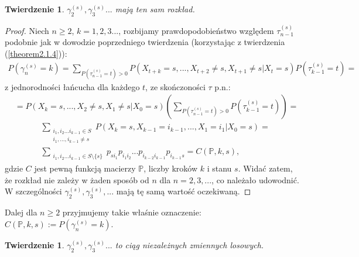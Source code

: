 \documentclass[a4paper]{article}
\theoremstyle{defn}
\theoremstyle{theorem}
\newtheorem{theorem}[defn]{Twierdzenie}
\theoremstyle{lemma}
\theoremstyle{cor}
\theoremstyle{fact}
\begin{document}
\begin{theorem}\label{theorem2.5.8}
$\gamma_2^{(s)}, \gamma_3^{(s)}...$ mają ten sam rozkład.
\end{theorem}
\begin{proof}
Niech $n\geq 2$, $k = 1,2,3...$, rozbijamy prawdopodobieństwo względem $\tau_{n-1}^{(s)}$ podobnie jak w dowodzie poprzedniego twierdzenia (korzystając z twierdzenia (\ref{theorem2.1.4})):\\
\begin{align*}
    P(\gamma_n^{(s)} = k) = \sum\limits_{P(\tau_{n-1}^{(s)} = t) > 0} P(X_{t+k} = s, ..., X_{t+2} \neq s, X_{t+1} \neq s| X_t = s)P(\tau_{k-1}^{(s)} = t) =
\end{align*}
z jednorodności łańcucha dla każdego $t$, ze skończoności $\tau$ p.n.:
\begin{align*}
    &=P(X_{k} = s, ..., X_{2} \neq s, X_{1} \neq s| X_0 = s) \left(\sum\limits_{P(\tau_{n-1}^{(s)} = t) > 0} P(\tau_{k-1}^{(s)} = t)\right) =
\end{align*}
\begin{align*}
    &\sum\limits_{\substack{i_1, i_2 ... i_{k-1} \in S\\ i_1,...,i_{k-1} \neq s}} P(X_{k} = s, X_{k-1} = i_{k-1}, ..., X_{1} = i_1 | X_0 = s)=\\
    &\sum\limits_{\substack{i_1, i_2 ... i_{k-1} \in S\setminus \{s\}}} p_{si_1}p_{i_1 i_2}...p_{i_{k-2}i_{k-1}} p_{i_{k-1} s} = C(\mathbb{P}, k, s),
\end{align*}
gdzie $C$ jest pewną funkcją macierzy $\mathbb{P}$, liczby kroków $k$ i stanu $s$.
Widać zatem, że rozkład nie zależy w żaden sposób od $n$ dla $n = 2, 3,...$, co należało udowodnić. W szczególności $\gamma_2^{(s)}, \gamma_3^{(s)}, ...$ mają tę samą wartość oczekiwaną.
\end{proof}
Dalej dla $n\geq 2$ przyjmujemy takie właśnie oznaczenie: $C(\mathbb{P}, k, s) := P(\gamma_n^{(s)} = k)$.
\begin{theorem}\label{theorem2.5.9}
$\gamma_2^{(s)}, \gamma_3^{(s)}...$ to ciąg niezależnych zmiennych losowych.
\end{theorem}
\end{document}
